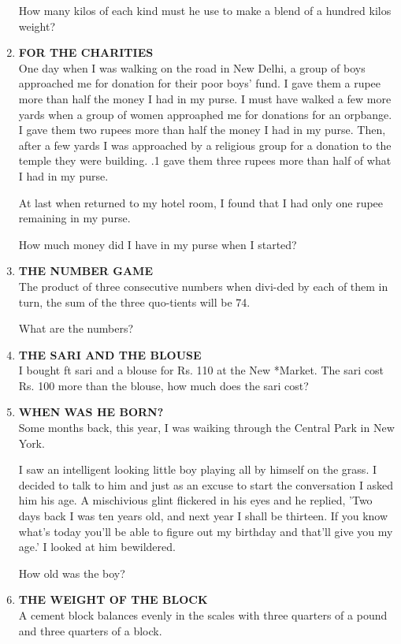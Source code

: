 \documentclass[12pt]{article}
\begin{document}
\begin{enumerate}
How  many  kilos  of each  kind  must  he use to make  a blend  of a hundred  kilos  weight? 
%
\item \textbf{FOR  THE  CHARITIES} \\
One day when  I was  walking  on the road  in New  Delhi, a group  of boys  approached  me  for donation  for their poor  boys'  fund.  I gave  them  a rupee  more  than  half the money  I had in my purse.  I must  have  walked  a few more  yards  when  a group  of women  approaphed  me  for donations  for an orpbange.  I gave  them  two  rupees  more than half  the  money  I had  in my purse.  Then,  after  a few yards  I was  approached  by a religious  group  for a donation  to the temple  they  were  building.  .1 gave  them three  rupees  more  than  half of what  I had in my purse. 

At last when  returned  to my hotel  room,  I found  that I had only  one rupee  remaining  in my purse. 

How  much  money  did  I have  in my  purse  when  I started? 
%
\item \textbf{THE  NUMBER  GAME} \\
The product  of three  consecutive  numbers  when  divi-ded by each  of them  in turn,  the sum  of the three  quo-tients  will be 74. 

What  are the numbers? 
%
\item \textbf{THE  SARI  AND  THE  BLOUSE} \\
I bought  ft sari  and  a blouse  for Rs.  110 at the New *Market.  The  sari  cost  Rs.  100 more  than  the blouse, how much  does  the sari cost? 
%
\item \textbf{WHEN  WAS  HE BORN?} \\
Some  months  back,  this  year,  I was  waiking  through the Central  Park  in New  York. 

I saw  an intelligent  looking  little  boy  playing  all by himself  on the grass.  I decided  to talk  to him  and  just as an excuse  to start  the  conversation  I asked  him  his age. A mischivious  glint  flickered  in his eyes  and he replied,  'Two  days  back  I was  ten years  old, and next  year I shall  be thirteen.  If you know  what's  today  you'll  be able to figure  out  my  birthday  and  that'll  give  you my age.'  I looked  at him bewildered. 

How  old was the boy? 
%
\item \textbf{THE WEIGHT  OF THE  BLOCK}\\
A cement  block  balances  evenly  in the scales  with  three quarters  of a pound  and three  quarters  of a block.  


\end{enumerate}
\end{document}
